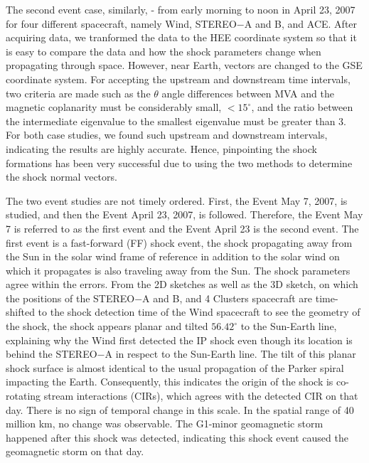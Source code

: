\documentclass[draft]{agujournal2019}
\begin{document}
The second event case, similarly, - from early morning to noon in April 23, 2007 for four different spacecraft, namely Wind, STEREO$-$A and B, and ACE.  After acquiring data, we tranformed the data to the HEE coordinate system so that it is easy to compare the data and how the shock parameters change when propagating through space. However, near Earth, vectors are changed to the GSE coordinate system. For accepting the upstream and downstream time intervals, two criteria are made such as the $\theta$ angle differences between MVA and the magnetic coplanarity must be considerably small, $<15^{\circ}$, and the ratio between the intermediate eigenvalue to the smallest eigenvalue must be greater than 3. For both case studies, we found such upstream and downstream intervals, indicating the results are highly accurate. Hence, pinpointing the shock formations has been very successful due to using the two methods to determine the shock normal vectors.

The two event studies are not timely ordered. First, the Event May 7, 2007, is studied, and then the Event April 23, 2007, is followed. Therefore, the Event May 7 is referred to as the first event and the Event April 23 is the second event. The first event is a fast-forward (FF) shock event, the shock propagating away from the Sun in the solar wind frame of reference in addition to the solar wind on which it propagates is also traveling away from the Sun. The shock parameters agree within the errors. From the 2D sketches as well as the 3D sketch, on which the positions of the STEREO$-$A and B, and 4 Clusters spacecraft are time-shifted to the shock detection time of the Wind spacecraft to see the geometry of the shock, the shock appears planar and tilted $56.42^{\circ}$ to the Sun-Earth line, explaining why the Wind first detected the IP shock even though its location is behind the STEREO$-$A in respect to the Sun-Earth line. The tilt of this planar shock surface is almost identical to the usual propagation of the Parker spiral impacting the Earth. Consequently, this indicates the origin of the shock is co-rotating stream interactions (CIRs), which agrees with the detected CIR on that day.  There is no sign of temporal change in this scale. In the spatial range of 40 million km, no change was observable.  The G1-minor geomagnetic storm happened after this shock was detected, indicating this shock event caused the geomagnetic storm on that day.
 
\end{document}
